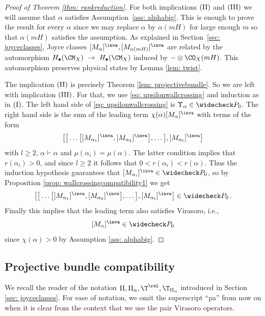 \begin{proof}[Proof of Theorem \ref{thm: rankreduction}]
For both implications $(\textup{II})$ and $(\textup{III})$ we will assume that $\alpha$ satisfies Assumption~\ref{ass: alphabig}. This is enough to prove the result for every $\alpha$ since we may replace $\alpha$ by $\alpha(mH)$ for large enough $m$ so that $\alpha(mH)$ satisfies the assumption. As explained in Section~\ref{sec: joyceclasses}, Joyce classes $[M_\alpha]^\inva, [M_{\alpha(mH)}]^\inva$ are related by the automorphism $H_\bullet(\CM_X)~\to~H_\bullet(\CM_X)$ induced by $-\otimes \CO_X(mH)$. This automorphism preserves physical states by Lemma \ref{lem: twist}.

The implication $(\textup{II})$ is precisely Theorem \ref{lem: projectivebundle}. So we are left with implication $(\textup{III})$. For that, we use \eqref{eq: upsilonwallcrossing} and induction as in $(\textup{I})$. The left hand side of \eqref{eq: upsilonwallcrossing} is $\Upsilon_\alpha\in \widecheck P_0$. The right hand side is the sum of the leading term $\chi(\alpha)[M_\alpha]^\inva$ with terms of the form
\[\big[\big[\ldots  \big[ [M_{\alpha_1}]^\inva,[M_{\alpha_2}]^\inva \big],\ldots \big ],[M_{\alpha_l}]^\inva \big]\]
with $l\geq 2$, $\underline{\alpha}\vdash \alpha$ and $\mu(\alpha_i)=\mu(\alpha)$. The latter condition implies that $r(\alpha_i)>0$, and since $l\geq 2$ it follows that $0<r(\alpha_i)<r(\alpha)$. Thus the induction hypothesis guarantees that $[M_{\alpha_i}]^\inva\in \widecheck P_0$, so by Proposition \ref{prop: wallcrossingcompatibility1} we get
\[\big[\big[\ldots  \big[ [M_{\alpha_1}]^\inva,[M_{\alpha_2}]^\inva \big],\ldots \big ],[M_{\alpha_l}]^\inva \big]\in \widecheck P_0\,.\]
Finally this implies that the leading term also satisfies Virasoro, i.e., \[[M_\alpha]^\inva\in \widecheck P_0\]
since $\chi(\alpha)>0$ by Assumption \ref{ass: alphabig}. \qedhere
\end{proof}



\subsection{Projective bundle compatibility}
 We recall the reader of the notation $\Pi, \Pi_\alpha, \T^{\rel}, \T_{\Pi_\alpha}$ introduced in Section \ref{sec: joyceclasses}. For ease of notation, we omit the superscript ``pa'' from now on when it is clear from the context that we use the pair Virasoro operators.




